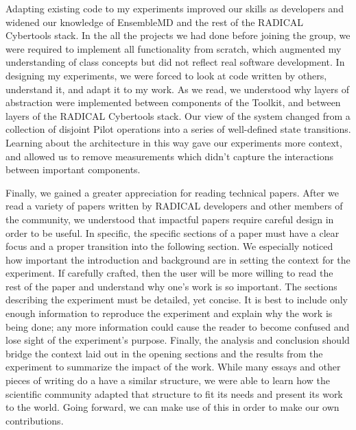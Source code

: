 \documentclass[]{article}
\begin{document}
	Adapting existing code to my experiments improved our skills as developers and widened our knowledge of EnsembleMD and the rest of the RADICAL Cybertools stack. In the all the projects we had done before joining the group, we were required to implement all functionality from scratch, which augmented my understanding of class concepts but did not reflect real software development. In designing my experiments, we were forced to look at code written by others, understand it, and adapt it to my work. As we read, we understood why layers of abstraction were implemented between components of the Toolkit, and between layers of the RADICAL Cybertools stack. Our view of the system changed from a collection of disjoint Pilot operations into a series of well-defined state transitions. Learning about the architecture in this way gave our experiments more context, and allowed us to remove measurements which didn't capture the interactions between important components. 


	Finally, we gained a greater appreciation for reading technical papers. After we read a variety of papers written by RADICAL developers and other members of the community, we understood that impactful papers require careful design in order to be useful. In specific, the specific sections of a paper must have a clear focus and a proper transition into the following section. We especially noticed how important the introduction and background are in setting the context for the experiment. If carefully crafted, then the user will be more willing to read the rest of the paper and understand why one's work is so important. The sections describing the experiment must be detailed, yet concise. It is best to include only enough information to reproduce the experiment and explain why the work is being done; any more information could cause the reader to become confused and lose sight of the experiment's purpose. Finally, the analysis and conclusion should bridge the context laid out in the opening sections and the results from the experiment to summarize the impact of the work. While many essays and other pieces of writing do a have a similar structure, we were able to learn how the scientific community adapted that structure to fit its needs and present its work to the world. Going forward, we can make use of this in order to make our own contributions.

\nocite{pstar}
\nocite{saga_paper}
\nocite{rp_arch}
\nocite{k_means}
\nocite{apache_hadoop_yarn}
\nocite{hadoop_paper}

{}
		
\end{document}
